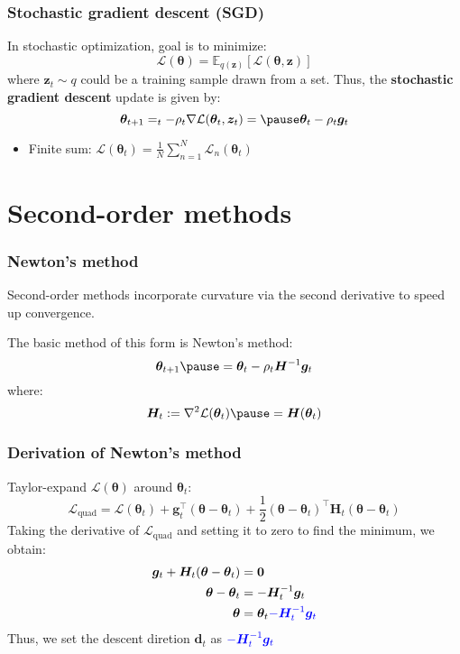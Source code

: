 \documentclass[smaller]{beamer}
\newcommand{\?}{\stackrel{?}{=}}
\newcommand{\fr}{\frac}
\newcommand{\bl}{\color{blue}}
\renewcommand{\th}{\theta}
\newcommand{\mb}{\mathbb}
\newcommand{\mc}{\mathcal}
\newcommand{\tr}{^{\top}}
\newcommand{\pe}{\pause}
\begin{document}
\begin{frame}
  \frametitle{Stochastic gradient descent (SGD)}
  In stochastic optimization, goal is to minimize:\pe
  \begin{equation}
    \mc{L}(\bm\th) = \mb{E}_{q(\bm z)}[\mc{L}(\bm\th,\bm z)]
  \end{equation}
  \pe
  where $\bm z_t \sim q$ could be a training sample drawn from a set. \pe Thus, the \textbf{stochastic gradient descent} update is given by:\pe
  \begin{equation}
    \bm\th_{t+1} = \bm_t -\rho_t\nabla\mc{L}(\bm\th_t,\bm z_t) = \pe \bm\th_t - \rho_t\bm g_t
  \end{equation}
  \pe
  \begin{itemize}
  \item Finite sum: $\mc{L}(\bm\th_t) = \fr1N\sum_{n=1}^N\mc{L}_n(\bm\th_t)$
  \end{itemize}
\end{frame}

\section{Second-order methods}
\begin{frame}
  \frametitle{Newton's method}
  \pe Second-order methods incorporate curvature via the second derivative to speed up convergence. \pe

  The basic method of this form is Newton's method:\pe
  \begin{equation}
    \bm\th_{t+1}  \pe = \bm\th_t - \rho_t\bm{H}^{-1}\bm g_t
  \end{equation}
  \pe
  where:
  \pe
  \begin{equation}
    \bm H_t := \nabla^2\mc{L}(\bm\th_t) \pe = \bm H(\bm\th_t)
  \end{equation}
  
\end{frame}

\begin{frame}
  \frametitle{Derivation of Newton's method}
  \pe
  Taylor-expand $\mc{L}(\bm\th)$ around $\bm\th_t$:\pe
  \begin{equation}
    \mc{L}_{\text{quad}} = \mc{L}(\bm\th_t) + \bm g_t\tr(\bm\th - \bm\th_t) + \fr12(\bm\th - \bm\th_t)\tr\bm H_t(\bm\th - \bm\th_t)
  \end{equation}
  \pe
  Taking the derivative of $\mc{L}_{\text{quad}}$ and setting it to zero to find the minimum, we obtain: \pe
  \begin{align}
    \bm g_t   + \bm H_t(\bm\th - \bm\th_t)  &= \bm 0 \\
    \bm\th - \bm\th_t &= -\bm H_t^{-1}\bm g_{t}\\
    \bm\th &= \bm\th_{t} {\bl -\bm H_t^{-1}\bm g_{t}}
  \end{align}
  \pe
  Thus, we set the descent diretion {\bl $\bm d_{t}$} as $ \bl -\bm H_t^{-1}\bm g_{t}$
\end{frame}
\end{document}
